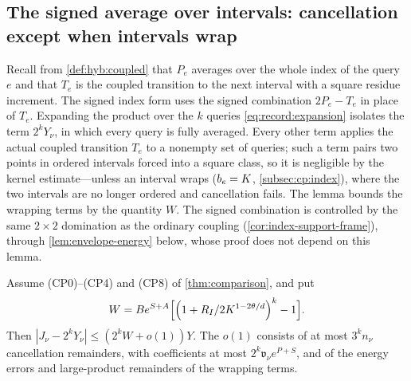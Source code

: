 \subsection{The signed average over intervals: cancellation except when intervals wrap}

Recall from \cref{def:hyb:coupled} that $P_e$ averages over the
whole index of the query $e$ and that $T_e$ is the coupled
transition to the next interval with a square residue increment.
The signed index form uses the signed combination $2P_e-T_e$ in
place of $T_e$. Expanding the product over the $k$ queries
\eqref{eq:record:expansion} isolates the term $2^kY_\nu$, in which
every query is fully averaged. Every other term applies the actual
coupled transition $T_e$ to a nonempty set of queries; such a term
pairs two points in ordered intervals forced into a square class,
so it is negligible by the kernel estimate---unless an interval
wraps ($b_e=K$, \cref{subsec:cp:index}), where the two intervals
are no longer ordered and cancellation fails. The lemma bounds the
wrapping terms by the quantity $W$. The signed combination is
controlled by the same $2\times2$ domination as the ordinary
coupling (\cref{cor:index-support-frame}), through
\cref{lem:envelope-energy} below, whose proof does not depend on
this lemma.

\begin{lemma}\label{lem:record:wrap-expansion}
Assume (CP0)--(CP4) and (CP8) of \cref{thm:comparison}, and put
\[
 W=Be^{S+A}\Bigl[\Bigl(1+R_I/2K^{1-2\theta/d}\Bigr)^k-1\Bigr].
\]
Then $|J_\nu-2^kY_\nu|\le(2^kW+o(1))Y$. The $o(1)$ consists of at most
$3^kn_\nu$ cancellation remainders, with coefficients at most
$2^k\mathfrak v_\nu e^{P+S}$, and of the energy errors and large-product
remainders of the wrapping terms.
\end{lemma}

